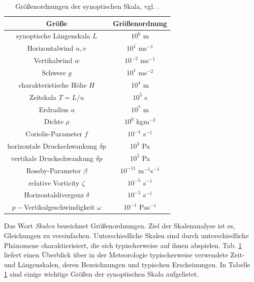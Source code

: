 \documentclass{book}
\begin{document}
\begin{table}
\centering
\begin{tabular}{|c|c|}
\hline \textbf{Größe} & \textbf{Größenordnung} \\
\hline\hline synoptische Längenskala $L$ & $10^6$ m \\
\hline Horizontalwind $u, v$ & $10^{1}$ ms$^{-1}$ \\
\hline Vertikalwind $w$ & $10^{-2}$ ms$^{-1}$\\
\hline Schwere $g$ & $10^{1}$ ms$^{-2}$\\
\hline charakteristische Höhe $H$ & $10^{4}$ m\\
\hline Zeitskala $T = L/u$ & $10^5$ s\\
\hline Erdradius $a$ & $10^7$ m\\
\hline Dichte $\rho$ & $10^0$ kgm$^{-3}$\\
\hline Coriolis-Parameter $f$ & $10^{-4}$ s$^{-1}$\\ 
\hline horizontale Druckschwankung $\delta p$ &$10^{3}$ Pa \\
\hline vertikale Druckschwankung $\delta p$ & $10^{5}$ Pa \\
\hline Rossby-Parameter $\beta$ & $10^{-11}$ m$^{-1}$s$^{-1}$\\
\hline relative Vorticity $\zeta$ & $10^{-5}$ s$^{-1}$\\
\hline Horizontaldivergenz $\delta$ & $10^{-5}$ s$^{-1}$ \\
\hline $p-$Vertikalgeschwindigkeit $\omega$ & $10^{-1}$ Pas$^{-1}$ \\
\hline 
\end{tabular}
\caption{Größenordnungen der synoptischen Skala, vgl. \cite{holton}.}
\label{tab:syn_scale}
\end{table}
\renewcommand{\arraystretch}{1}

Das Wort \textit{Skalen} bezeichnet Größenordnungen. Ziel der Skalenanalyse ist es, Gleichungen zu vereinfachen. Unterschiedliche Skalen sind durch unterschiedliche Phänomene charaktierisiert, die sich typischerweise auf ihnen abspielen. Tab. \ref{tab:syn_scale} liefert einen Überblick über in der Meteorologie typischerweise verwendete Zeit- und Längenskalen, deren Bezeichnungen und typischen Erscheinungen. In Tabelle \ref{tab:syn_scale} sind einige wichtige Größen der synoptischen Skala aufgelistet.
\end{document}
